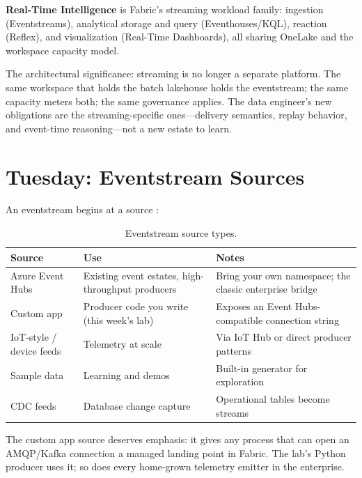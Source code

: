 \begin{definitionbox}
\textbf{Real-Time Intelligence} is Fabric's streaming workload family: ingestion (Eventstreams), analytical storage and query (Eventhouses/KQL), reaction (Reflex), and visualization (Real-Time Dashboards), all sharing OneLake and the workspace capacity model.
\end{definitionbox}

The architectural significance: streaming is no longer a separate platform. The same workspace that holds the batch lakehouse holds the eventstream; the same capacity meters both; the same governance applies. The data engineer's new obligations are the streaming-specific ones---delivery semantics, replay behavior, and event-time reasoning---not a new estate to learn.

\section{Tuesday: Eventstream Sources}
An eventstream begins at a source \cite{microsoftFabricEventstreams}:

\begin{table}[H]
\centering
\small
\begin{tabular}{@{}p{3.6cm}p{5.2cm}p{5.0cm}@{}}
\toprule
\textbf{Source} & \textbf{Use} & \textbf{Notes} \\
\midrule
Azure Event Hubs & Existing event estates, high-throughput producers & Bring your own namespace; the classic enterprise bridge \\
Custom app & Producer code you write (this week's lab) & Exposes an Event Hubs-compatible connection string \\
IoT-style / device feeds & Telemetry at scale & Via IoT Hub or direct producer patterns \\
Sample data & Learning and demos & Built-in generator for exploration \\
CDC feeds & Database change capture & Operational tables become streams \\
\bottomrule
\end{tabular}
\caption{Eventstream source types.}
\label{tab:chapter13-sources}
\end{table}

The custom app source deserves emphasis: it gives any process that can open an AMQP/Kafka connection a managed landing point in Fabric. The lab's Python producer uses it; so does every home-grown telemetry emitter in the enterprise.

